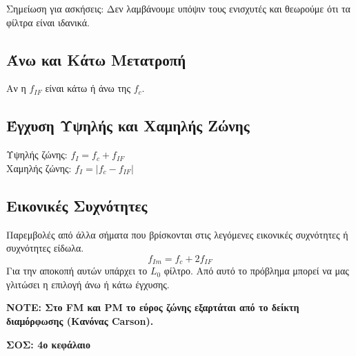 \documentclass[a4paper,12pt]{article}
\begin{document}
Σημείωση για ασκήσεις: Δεν λαμβάνουμε υπόψιν τους ενισχυτές και θεωρούμε ότι τα φίλτρα είναι ιδανικά.

\subsection*{Άνω και Κάτω Μετατροπή}
Αν η \(f_{IF}\) είναι κάτω ή άνω της \(f_c\).

\subsection*{Έγχυση Υψηλής και Χαμηλής Ζώνης}
Υψηλής ζώνης: \(f_I = f_c + f_{IF}\)\\
Χαμηλής ζώνης: \(f_I = |f_c - f_{IF}|\)

\subsection*{Εικονικές Συχνότητες}
Παρεμβολές από άλλα σήματα που βρίσκονται στις λεγόμενες εικονικές συχνότητες ή συχνότητες είδωλα.
\[
f_{Im} = f_c + 2 f_{IF}
\]
Για την αποκοπή αυτών υπάρχει το \(L_0\) φίλτρο. Από αυτό το πρόβλημα μπορεί να μας γλιτώσει η επιλογή άνω ή κάτω έγχυσης.

\textbf{NOTE: Στο FM και PM το εύρος ζώνης εξαρτάται από το δείκτη διαμόρφωσης (Κανόνας Carson).}

\textbf{ΣΟΣ: 4ο κεφάλαιο}
\end{document}

